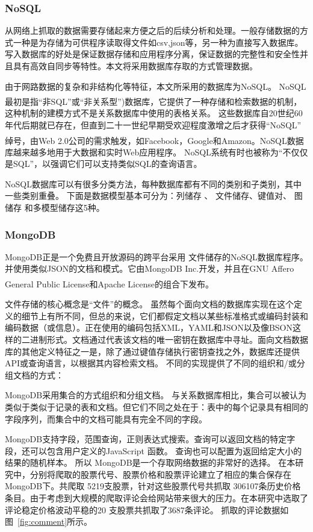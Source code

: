 \documentclass[cs4size,a4paper]{ctexart}
\numberwithin{equation}{section}
\numberwithin{table}{section}
\numberwithin{figure}{section}
\newcommand{\upcite}[1]{\textsuperscript{\textsuperscript{\cite{#1}}}}%
\begin{document}
\subsubsection{NoSQL}

从网络上抓取的数据需要存储起来方便之后的后续分析和处理。一般存储数据的方式一种是为存储为可供程序读取得文件如csv,json等，另一种为直接写入数据库。
写入数据库的好处是保证数据存储和应用程序分离，保证数据的完整性和安全性并且具有高效自同步等特性。本文将采用数据库存取的方式管理数据。

由于网路数据的复杂和非结构化等特征，本文所采用的数据库为NoSQL。 NoSQL最初是指“非SQL”或“非关系型”)\upcite{Nosql}数据库，它提供了一种存储和检索数据的机制，这种机制的建模方式不是关系数据库中使用的表格关系。 这些数据库自20世纪60年代后期就已存在，但直到二十一世纪早期受欢迎程度激增之后才获得“NoSQL” 绰号，由Web 2.0公司的需求触发，如Facebook，Google和Amazon\upcite{AamzonNosql}。NoSQL数据库越来越多地用于大数据和实时Web应用程序。 NoSQL系统有时也被称为“不仅仅是SQL”，以强调它们可以支持类似SQL的查询语言。

NoSQL数据库可以有很多分类方法，每种数据库都有不同的类别和子类别，其中一些类别重叠。 下面是数据模型基本可分为：列储存 、 文件储存、键值对、 图储存 和多模型储存这5种。

\subsubsection{MongoDB}

MongoDB正是一个免费且开放源码的跨平台采用 文件储存的NoSQL数据库程序。
并使用类似JSON的文档和模式。它由MongoDB Inc.开发，并且在GNU Affero General Public License和Apache License的组合下发布。\upcite{MongoDb}

文件存储的核心概念是“文件”的概念。
虽然每个面向文档的数据库实现在这个定义的细节上有所不同，但总的来说，它们都假定文档以某些标准格式或编码封装和编码数据（或信息）。正在使用的编码包括XML，YAML和JSON以及像BSON这样的二进制形式。文档通过代表该文档的唯一密钥在数据库中寻址。面向文档数据库的其他定义特征之一是，除了通过键值存储执行密钥查找之外，数据库还提供API或查询语言，以根据其内容检索文档。
不同的实现提供了不同的组织和/或分组文档的方式：

MongoDB采用集合的方式组织和分组文档。 与关系数据库相比，集合可以被认为类似于类似于记录的表和文档。但它们不同之处在于：表中的每个记录具有相同的字段序列，而集合中的文档可能具有完全不同的字段。

MongoDB支持字段，范围查询，正则表达式搜索。查询可以返回文档的特定字段，还可以包含用户定义的JavaScript 函数。
查询也可以配置为返回给定大小的结果的随机样本。
所以 MongoDB是一个存取网络数据的非常好的选择。
在本研究中，分别将爬取的股票代号、股票价格和股票评论建立了相应的集合保存在MongoDB下。共爬取 5219支股票，针对这些股票代号共抓取 306107条历史价格条目。由于考虑到大规模的爬取评论会给网站带来很大的压力。在本研究中选取了评论稳定价格波动平稳的20 支股票共抓取了3687条评论。
抓取的评论数据如图~\ref{fig:comment}所示。
\end{document}
